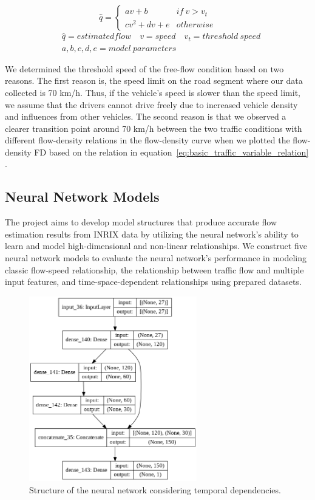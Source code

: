 \documentclass[english]{kththesis}
\begin{document}
\begin{equation}
    \hat{q} = 
    \left \{\begin{matrix}
    av + b & if \ v > v_t\\ 
    cv^2 + dv + e & otherwise
    \end{matrix}\right.
    \label{eq:baseline}
\end{equation}
\begin{align*}
    & \hat{q} = estimated flow \quad v = speed \quad v_t=threshold \ speed \\
    & a,b,c,d,e=model \ parameters
\end{align*}

We determined the threshold speed of the free-flow condition based on two reasons. The first reason is, the speed limit on the road segment where our data collected is 70 km/h. Thus, if the vehicle's speed is slower than the speed limit, we assume that the drivers cannot drive freely due to increased vehicle density and influences from other vehicles. The second reason is that we observed a clearer transition point around 70 km/h between the two traffic conditions with different flow-density relations in the flow-density curve when we plotted the flow-density FD based on the relation in equation~\ref{eq:basic_traffic_variable_relation} \cite{blandin_individual_speed, nielsen_flow-speed_relations}.


\subsection{Neural Network Models}
The project aims to develop model structures that produce accurate flow estimation results from INRIX data by utilizing the neural network's ability to learn and model high-dimensional and non-linear relationships. We construct five neural network models to evaluate the neural network's performance in modeling classic flow-speed relationship, the relationship between traffic flow and multiple input features, and time-space-dependent relationships using prepared datasets.

\begin{figure}[!ht]
    \centering
    \includegraphics[width=0.65\textwidth]{temporal_ann_structure.png}
    \caption{Structure of the neural network considering temporal dependencies.}
    \label{fig:temporal_ann_structure}
\end{figure}
\end{document}
